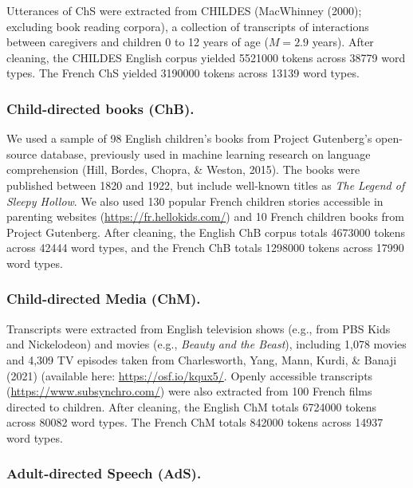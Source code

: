 \documentclass[10pt, letterpaper]{article}
\begin{document}
Utterances of ChS were extracted from CHILDES (MacWhinney (2000);
excluding book reading corpora), a collection of transcripts of
interactions between caregivers and children 0 to 12 years of age
(\(M=2.9\) years). After cleaning, the CHILDES English corpus yielded
5521000 tokens across 38779 word types. The French ChS yielded 3190000
tokens across 13139 word types.

\hypertarget{child-directed-books-chb.}{%
\subsubsection{Child-directed books
(ChB).}\label{child-directed-books-chb.}}

We used a sample of 98 English children's books from Project Gutenberg's
open-source database, previously used in machine learning research on
language comprehension (Hill, Bordes, Chopra, \& Weston, 2015). The
books were published between 1820 and 1922, but include well-known
titles as \emph{The Legend of Sleepy Hollow}. We also used 130 popular
French children stories accessible in parenting websites
(\url{https://fr.hellokids.com/}) and 10 French children books from
Project Gutenberg. After cleaning, the English ChB corpus totals 4673000
tokens across 42444 word types, and the French ChB totals 1298000 tokens
across 17990 word types.

\hypertarget{child-directed-media-chm.}{%
\subsubsection{Child-directed Media
(ChM).}\label{child-directed-media-chm.}}

Transcripts were extracted from English television shows (e.g., from PBS
Kids and Nickelodeon) and movies (e.g., \emph{Beauty and the Beast}),
including 1,078 movies and 4,309 TV episodes taken from Charlesworth,
Yang, Mann, Kurdi, \& Banaji (2021) (available here:
\url{https://osf.io/kqux5/}. Openly accessible transcripts
(\url{https://www.subsynchro.com/}) were also extracted from 100 French
films directed to children. After cleaning, the English ChM totals
6724000 tokens across 80082 word types. The French ChM totals 842000
tokens across 14937 word types.

\hypertarget{adult-directed-speech-ads.}{%
\subsubsection{Adult-directed Speech
(AdS).}\label{adult-directed-speech-ads.}}
\end{document}
